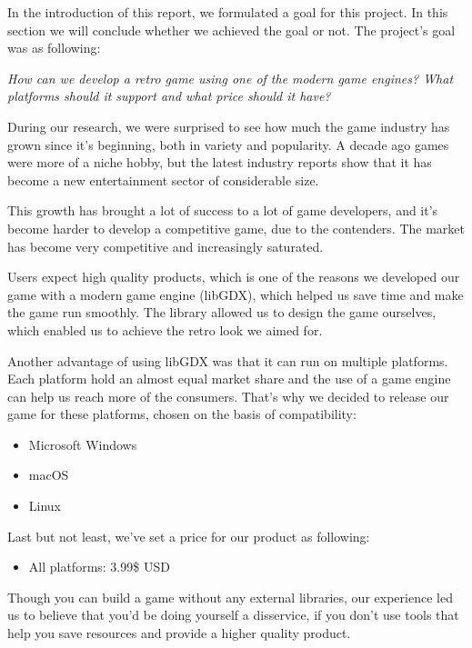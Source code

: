 \documentclass[12p]{article}
\begin{document}
In the introduction of this report, we formulated a goal for this project. In this section we will conclude whether we achieved the goal or not. The project's goal was as following:

\textit{How can we develop a retro game using one of the modern game engines? What platforms should it support and what price should it have?}

During our research, we were surprised to see how much the game industry has grown since it's beginning, both in variety and popularity. A decade ago games were more of a niche hobby, but the latest industry reports show that it has become a new entertainment sector of considerable size.

This growth has brought a lot of success to a lot of game developers, and it's become harder to develop a competitive game, due to the contenders. The market has become very competitive and increasingly saturated.

Users expect high quality products, which is one of the reasons we developed our game with a modern game engine (libGDX), which helped us save time and make the game run smoothly. The library allowed us to design the game ourselves, which enabled us to achieve the retro look we aimed for.

Another advantage of using libGDX was that it can run on multiple platforms. Each platform hold an almost equal market share and the use of a game engine can help us reach more of the consumers. That's why we decided to release our game for these platforms, chosen on the basis of compatibility:

\begin{itemize}
  \item Microsoft Windows
  \item macOS
  \item Linux
\end{itemize}

Last but not least, we've set a price for our product as following: 

\begin{itemize}
 \item All platforms: 3.99\$ USD
\end{itemize}

Though you can build a game without any external libraries, our experience led us to believe that you'd be doing yourself a disservice, if you don't use tools that help you save resources and provide a higher quality product.

\end{document}

